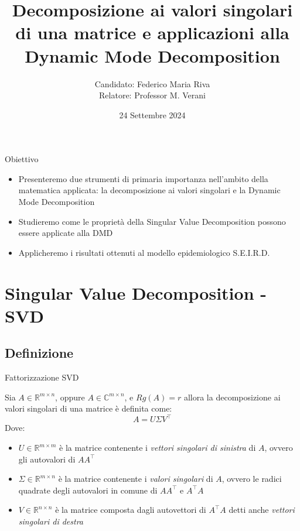 \documentclass[serif]{beamer}
\title{Decomposizione ai valori singolari di una matrice e applicazioni alla Dynamic Mode Decomposition}
\author{Candidato: Federico Maria Riva \\ Relatore: Professor M. Verani}
\date{24 Settembre 2024}
\newcommand{\R}{\mathbb{R}}
\begin{document}
\begin{frame}
    \titlepage
\end{frame}

\begin{frame}
    \tableofcontents
\end{frame}

\begin{frame}{Obiettivo}
\begin{itemize}
    \item Presenteremo due strumenti di primaria importanza nell'ambito della matematica applicata: la decomposizione ai valori singolari e la Dynamic Mode Decomposition
    \item  Studieremo come le proprietà della Singular Value Decomposition possono essere applicate alla DMD
    \item Applicheremo i risultati ottenuti al modello epidemiologico S.E.I.R.D. 
\end{itemize}
\end{frame}

\section{Singular Value Decomposition - SVD}

\subsection{Definizione}
\begin{frame}{Fattorizzazione SVD}
\begin{definition}
Sia $A\in\mathbb{R}^{m\times n}$, oppure  $A\in\mathbb{C}^{m\times n}$, e \( Rg(A)=r\) allora la decomposizione ai valori singolari di una matrice è definita come:
\[
A = U \Sigma V^\top      
\]
Dove: 
\begin{itemize}
    \item \(U \in \R^{m \times m}\) è la matrice contenente i \textit{vettori singolari di sinistra} di \(A\), ovvero gli autovalori di \(A A^\top\)
    \item \( \Sigma \in \R^{m \times n} \) è la matrice contenente i \textit{valori singolari} di \(A\), ovvero le radici quadrate degli autovalori in comune di \(AA^\top\) e \(A^\top A\)
    \item \( V \in \R^{n \times n} \) è la matrice composta dagli autovettori di \( A^\top A\) detti anche \textit{vettori singolari di destra}
\end{itemize}
\end{definition}
\end{frame}
\end{document}
